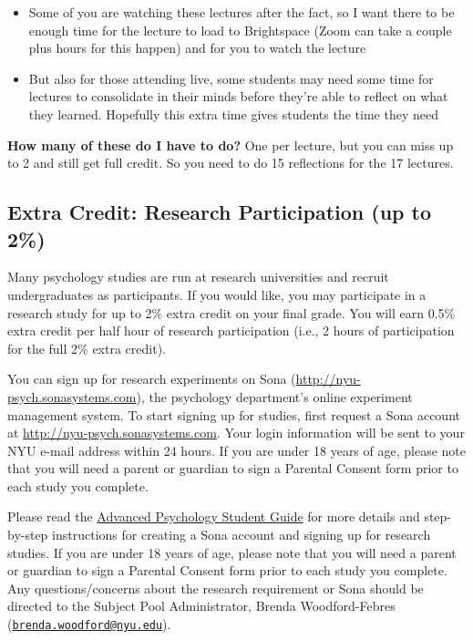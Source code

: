 \documentclass[
]{book}
\providecommand{\tightlist}{%
  \setlength{\itemsep}{0pt}\setlength{\parskip}{0pt}}
\begin{document}
\begin{itemize}
\tightlist
\item
  Some of you are watching these lectures after the fact, so I want there to be enough time for the lecture to load to Brightspace (Zoom can take a couple plus hours for this happen) and for you to watch the lecture
\item
  But also for those attending live, some students may need some time for lectures to consolidate in their minds before they're able to reflect on what they learned. Hopefully this extra time gives students the time they need
\end{itemize}

\textbf{How many of these do I have to do?} One per lecture, but you can miss up to 2 and still get full credit. So you need to do 15 reflections for the 17 lectures.

\hypertarget{extra-credit-research-participation-up-to-2}{%
\subsection{Extra Credit: Research Participation (up to 2\%)}\label{extra-credit-research-participation-up-to-2}}

Many psychology studies are run at research universities and recruit undergraduates as participants. If you would like, you may participate in a research study for up to 2\% extra credit on your final grade. You will earn 0.5\% extra credit per half hour of research participation (i.e., 2 hours of participation for the full 2\% extra credit).

You can sign up for research experiments on Sona (\url{http://nyu-psych.sonasystems.com}), the psychology department's online experiment management system. To start signing up for studies, first request a Sona account at \url{http://nyu-psych.sonasystems.com}. Your login information will be sent to your NYU e-mail address within 24 hours. If you are under 18 years of age, please note that you will need a parent or guardian to sign a Parental Consent form prior to each study you complete.

Please read the \href{https://as.nyu.edu/content/dam/nyu-as/psychology/documents/research/research-requirements/AdvancedStudentGuide_Rev2017.pdf}{Advanced Psychology Student Guide} for more details and step-by-step instructions for creating a Sona account and signing up for research studies. If you are under 18 years of age, please note that you will need a parent or guardian to sign a Parental Consent form prior to each study you complete. Any questions/concerns about the research requirement or Sona should be directed to the Subject Pool Administrator, Brenda Woodford-Febres (\href{mailto:brenda.woodford@nyu.edu}{\nolinkurl{brenda.woodford@nyu.edu}}).
\end{document}
